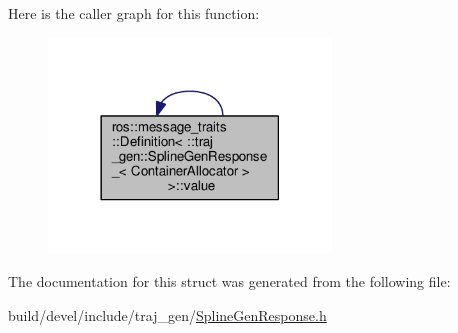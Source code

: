 Here is the caller graph for this function\+:
\nopagebreak
\begin{figure}[H]
\begin{center}
\leavevmode
\includegraphics[width=213pt]{structros_1_1message__traits_1_1_definition_3_01_1_1traj__gen_1_1_spline_gen_response___3_01_container_allocator_01_4_01_4_ae196e8f9afb8a1e90b1a408ecd8aca34_icgraph}
\end{center}
\end{figure}




The documentation for this struct was generated from the following file\+:\begin{DoxyCompactItemize}
\item 
build/devel/include/traj\+\_\+gen/\hyperlink{_spline_gen_response_8h}{Spline\+Gen\+Response.\+h}\end{DoxyCompactItemize}
